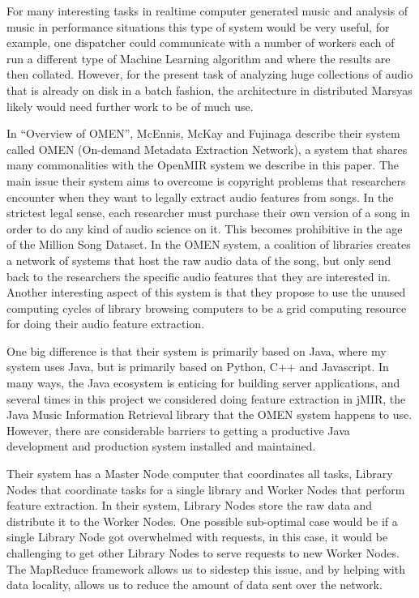 \documentclass[12pt,oneside]{book}
\begin{document}
For many interesting tasks in realtime computer generated music and
analysis of music in performance situations this type of system would
be very useful, for example, one dispatcher could communicate with a
number of workers each of run a different type of Machine Learning
algorithm and where the results are then collated.  However, for the
present task of analyzing huge collections of audio that is already on
disk in a batch fashion, the architecture in distributed Marsyas
likely would need further work to be of much use.



In ``Overview of OMEN''\cite{McEnnis2006}, McEnnis, McKay and Fujinaga
describe their system called OMEN (On-demand Metadata Extraction
Network), a system that shares many commonalities with the OpenMIR
system we describe in this paper.  The main issue their system aims to
overcome is copyright problems that researchers encounter when they
want to legally extract audio features from songs.  In the strictest
legal sense, each researcher must purchase their own version of a song
in order to do any kind of audio science on it.  This becomes
prohibitive in the age of the Million Song Dataset.  In the OMEN
system, a coalition of libraries creates a network of systems that
host the raw audio data of the song, but only send back to the
researchers the specific audio features that they are interested in.
Another interesting aspect of this system is that they propose to use
the unused computing cycles of library browsing computers to be a grid
computing resource for doing their audio feature extraction.

One big difference is that their system is primarily based on Java,
where my system uses Java, but is primarily based on Python, C++ and
Javascript.  In many ways, the Java ecosystem is enticing for building
server applications, and several times in this project we considered
doing feature extraction in jMIR, the Java Music Information Retrieval
library that the OMEN system happens to use.  However, there are
considerable barriers to getting a productive Java development and
production system installed and maintained.

Their system has a Master Node computer that coordinates all tasks,
Library Nodes that coordinate tasks for a single library and Worker
Nodes that perform feature extraction.  In their system, Library Nodes
store the raw data and distribute it to the Worker Nodes.  One
possible sub-optimal case would be if a single Library Node got
overwhelmed with requests, in this case, it would be challenging to
get other Library Nodes to serve requests to new Worker Nodes.  The
MapReduce framework allows us to sidestep this issue, and by helping
with data locality, allows us to reduce the amount of data sent over
the network.
\end{document}
